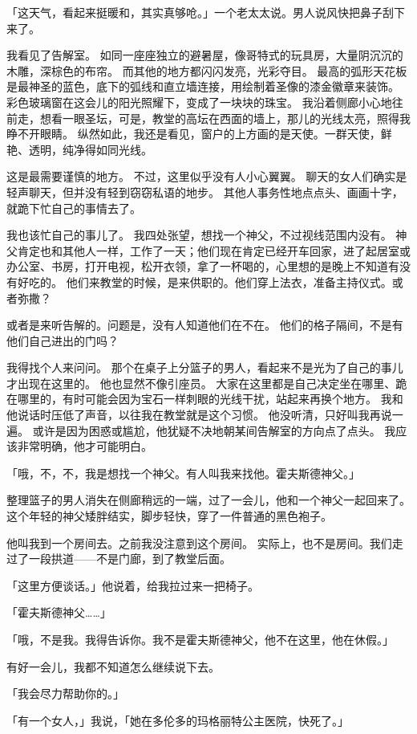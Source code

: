\documentclass[UTF8]{ctexart}
\begin{document}
「这天气，看起来挺暖和，其实真够呛。」一个老太太说。男人说风快把鼻子刮下来了。

我看见了告解室。
如同一座座独立的避暑屋，像哥特式的玩具房，大量阴沉沉的木雕，深棕色的布帘。
而其他的地方都闪闪发亮，光彩夺目。
最高的弧形天花板是最神圣的蓝色，底下的弧线和直立墙连接，用绘制着圣像的漆金徽章来装饰。
彩色玻璃窗在这会儿的阳光照耀下，变成了一块块的珠宝。
我沿着侧廊小心地往前走，想看一眼圣坛，可是，教堂的高坛在西面的墙上，那儿的光线太亮，照得我睁不开眼睛。
纵然如此，我还是看见，窗户的上方画的是天使。一群天使，鲜艳、透明，纯净得如同光线。

这是最需要谨慎的地方。
不过，这里似乎没有人小心翼翼。
聊天的女人们确实是轻声聊天，但并没有轻到窃窃私语的地步。
其他人事务性地点点头、画画十字，就跪下忙自己的事情去了。

我也该忙自己的事儿了。
我四处张望，想找一个神父，不过视线范围内没有。
神父肯定也和其他人一样，工作了一天；他们现在肯定已经开车回家，进了起居室或办公室、书房，打开电视，松开衣领，拿了一杯喝的，心里想的是晚上不知道有没有好吃的。
他们来教堂的时候，是来供职的。他们穿上法衣，准备主持仪式。或者弥撒？

或者是来听告解的。问题是，没有人知道他们在不在。
他们的格子隔间，不是有他们自己进出的门吗？

我得找个人来问问。
那个在桌子上分篮子的男人，看起来不是光为了自己的事儿才出现在这里的。
他也显然不像引座员。
大家在这里都是自己决定坐在哪里、跪在哪里的，有时可能会因为宝石一样刺眼的光线干扰，站起来再换个地方。
我和他说话时压低了声音，以往我在教堂就是这个习惯。
他没听清，只好叫我再说一遍。
或许是因为困惑或尴尬，他犹疑不决地朝某间告解室的方向点了点头。
我应该非常明确，他才可能明白。

「哦，不，不，我是想找一个神父。有人叫我来找他。霍夫斯德神父。」

整理篮子的男人消失在侧廊稍远的一端，过了一会儿，他和一个神父一起回来了。
这个年轻的神父矮胖结实，脚步轻快，穿了一件普通的黑色袍子。

他叫我到一个房间去。之前我没注意到这个房间。
实际上，也不是房间。我们走过了一段拱道——不是门廊，到了教堂后面。

「这里方便谈话。」他说着，给我拉过来一把椅子。

「霍夫斯德神父……」

「哦，不是我。我得告诉你。我不是霍夫斯德神父，他不在这里，他在休假。」

有好一会儿，我都不知道怎么继续说下去。

「我会尽力帮助你的。」

「有一个女人，」我说，「她在多伦多的玛格丽特公主医院，快死了。」
\end{document}
